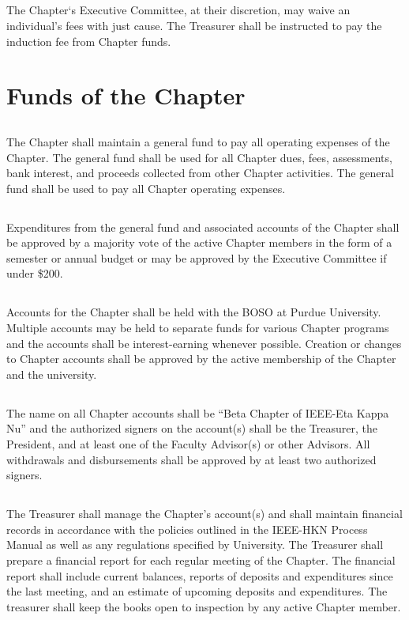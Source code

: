 \documentclass[10pt, oneside]{article}
\begin{document}
\subsection{}
The Chapter‘s Executive Committee, at their discretion, may waive an individual’s fees with just cause. The Treasurer shall be instructed to pay the induction fee from Chapter funds.

\section{Funds of the Chapter}
\subsection{}
The Chapter shall maintain a general fund to pay all operating expenses of the Chapter. The general fund shall be used for all Chapter dues, fees, assessments, bank interest, and proceeds collected from other Chapter activities. The general fund shall be used to pay all Chapter operating expenses.

\subsection{}
Expenditures from the general fund and associated accounts of the Chapter shall be approved by a majority vote of the active Chapter members in the form of a semester or annual budget or may be approved by the Executive Committee if under \$200.

\subsection{}
Accounts for the Chapter shall be held with the BOSO at Purdue University.
Multiple accounts may be held to separate funds for various Chapter programs and the accounts shall be interest-earning whenever possible. Creation or changes to Chapter accounts shall be approved by the active membership of the Chapter and the university.

\subsection{}
The name on all Chapter accounts shall be “Beta Chapter of IEEE-Eta Kappa Nu” and the authorized signers on the account(s) shall be the Treasurer, the President, and at least one of the Faculty Advisor(s) or other Advisors. All withdrawals and disbursements shall be approved by at least two authorized signers.
\subsection{}
The Treasurer shall manage the Chapter’s account(s) and shall maintain financial records in accordance with the policies outlined in the IEEE-HKN Process Manual as well as any regulations specified by University. The Treasurer shall prepare a financial report for each regular meeting of the Chapter. The financial report shall include current balances, reports of deposits and expenditures since the last meeting, and an estimate of upcoming deposits and expenditures. The treasurer shall keep the books open to inspection by any active Chapter member.
\end{document}
